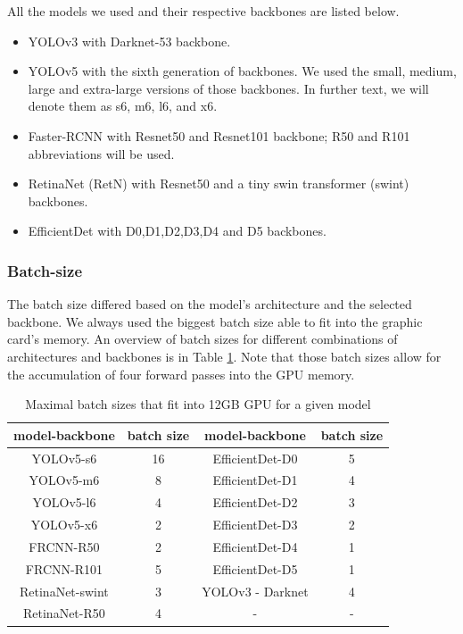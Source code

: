 All the models we used and their respective backbones are listed below.
\begin{itemize}
    \item YOLOv3 with Darknet-53 backbone.
    \item YOLOv5 with the sixth generation of backbones. We used the small, medium, large and extra-large versions of those backbones. In further text, we will denote them as s6, m6, l6, and x6.
    \item Faster-RCNN with Resnet50 and Resnet101 backbone; R50 and R101 abbreviations will be used.
    \item RetinaNet (RetN) with Resnet50 and a tiny swin transformer (swint) backbones.
    \item EfficientDet with D0,D1,D2,D3,D4 and D5 backbones.
\end{itemize}

\subsubsection{Batch-size}
The batch size differed based on the model's architecture and the selected backbone. We always used the biggest batch size able to fit into the graphic card's memory. An overview of batch sizes for different combinations of architectures and backbones is in Table \ref{tab:batch_sizes}. Note that those batch sizes allow for the accumulation of four forward passes into the GPU memory.

\begin{table}
    \centering
    \begin{tabular}{|c|c|c|c|}
        \hline
        model-backbone  & batch size & model-backbone   & batch size \\ \hline
        YOLOv5-s6       & 16         & EfficientDet-D0  & 5          \\ \hline
        YOLOv5-m6       & 8          & EfficientDet-D1  & 4          \\ \hline
        YOLOv5-l6       & 4          & EfficientDet-D2  & 3          \\ \hline
        YOLOv5-x6       & 2          & EfficientDet-D3  & 2          \\ \hline
        FRCNN-R50       & 2          & EfficientDet-D4  & 1          \\ \hline
        FRCNN-R101      & 5          & EfficientDet-D5  & 1          \\ \hline
        RetinaNet-swint & 3          & YOLOv3 - Darknet & 4          \\ \hline
        RetinaNet-R50   & 4          & -                & -          \\ \hline
    \end{tabular}
    \caption{Maximal batch sizes that fit into 12GB GPU for a given model}
    \label{tab:batch_sizes}
\end{table}



